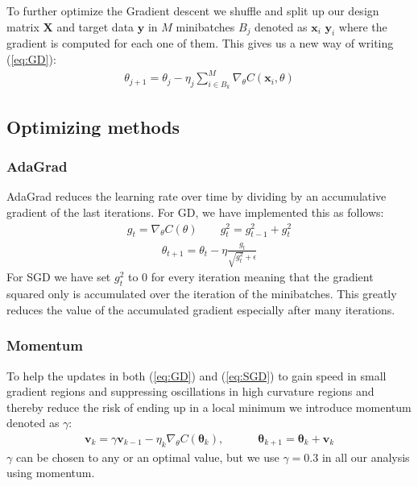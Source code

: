 \documentclass[11pt]{article}
\begin{document}
To further optimize the Gradient descent we shuffle and split up our design matrix $\boldsymbol{X}$ and target data $\boldsymbol{y}$ in $M$ minibatches $B_j$ denoted as $\boldsymbol{x}_i$ $\boldsymbol{y}_i$ where the gradient is computed for each one of them. This gives us a new way of writing (\ref{eq:GD}):
\begin{align}
  \label{eq:SGD}
  \theta_{j+1} = \theta_j - \eta_j \sum_{i\in B_k}^M \nabla_\theta C(\boldsymbol{x}_i, \theta)
\end{align}

\subsection{Optimizing methods}
\subsubsection*{AdaGrad}
AdaGrad reduces the learning rate over time by dividing by an accumulative gradient of the last iterations. For GD, we have implemented this as follows:
\begin{align*}
  g_t = \nabla_\theta C(\theta) \quad\quad g_t^2 = g_{t-1}^2 + g_t^2
\end{align*}
\begin{align*}
  \theta_{t+1} = \theta_t - \eta \frac{g_t}{\sqrt{g_t^2} + \epsilon}
\end{align*}
For SGD we have set $g_t^2$ to 0 for every iteration meaning that the gradient squared only is accumulated over the iteration of the minibatches. This greatly reduces the value of the accumulated gradient especially after many iterations.
\subsubsection*{Momentum}
To help the updates in both (\ref{eq:GD}) and (\ref{eq:SGD}) to gain speed in small gradient regions and suppressing oscillations in high curvature regions and thereby reduce the risk of ending up in a local minimum we introduce momentum denoted as $\gamma$:
\begin{align}
  \label{eq:GD_mom}
  \boldsymbol{v}_{k} = \gamma\boldsymbol{v}_{k-1} - \eta_k \nabla_\theta C(\boldsymbol{\theta}_k),\quad\quad\quad\boldsymbol{\theta}_{k+1} = \boldsymbol{\theta}_k + \boldsymbol{v}_k
\end{align}
$\gamma$ can be chosen to any or an optimal value, but we use $\gamma=0.3$ in all our analysis using momentum.
\end{document}
